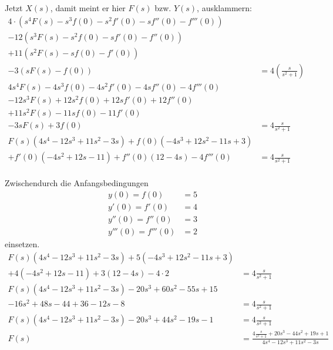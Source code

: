 \documentclass[%
	paper=a4,%
	pagesize=auto	%
	]{scrartcl}
\begin{document}
	Jetzt \(X(s)\), damit meint er hier \(F(s)\) bzw. \(Y(s)\), ausklammern:
\begin{align*}
	4 \cdot \left(s^4 F(s) -s^3 f(0) - s^2 f'(0) - sf''(0) - f'''(0)\right)\\
		- 12 \left(s^3 F(s) - s^2 f(0) - sf'(0) - f''(0)\right)\\
		+ 11 \left(s^2 F(s) - sf(0) - f'(0)\right)\\
		- 3 \left(s F(s) - f(0)\right)
		& = 4 \left(\frac{s}{s^2 + 1}\right)\\
	4 s^4 F(s) - 4 s^3 f(0) - 4 s^2 f'(0) - 4 sf''(0) - 4 f'''(0)\\
		- 12 s^3 F(s) + 12 s^2 f(0) + 12 sf'(0) + 12 f''(0)\\
		+ 11 s^2 F(s) - 11 s f(0) - 11 f'(0)\\
		- 3 s F(s) + 3 f(0)
		& = 4 \frac{s}{s^2 + 1}\\
	F(s) \left(4 s^4 - 12 s^3 + 11 s^2 - 3 s\right)
		+ f(0) \left(- 4 s^3 + 12 s^2 - 11 s + 3\right)\\
		+ f'(0) \left(- 4 s^2 + 12 s - 11\right)
		+ f''(0) \left(12 - 4s\right)
		- 4 f'''(0)
		& = 4 \frac{s}{s^2 + 1}\\
\end{align*}

Zwischendurch die Anfangsbedingungen
\begin{align*}
	y(0) = f(0) &= 5\\
	y'(0) = f'(0) &= 4\\
	y''(0) = f''(0) &= 3\\
	y'''(0) = f'''(0) &= 2
\end{align*}
einsetzen.
\begin{align*}
	F(s) \left(4 s^4 - 12 s^3 + 11 s^2 - 3 s\right)
		+ 5 \left(- 4 s^3 + 12 s^2 - 11 s + 3\right)\\
		+ 4 \left(- 4 s^2 + 12 s - 11\right)
		+ 3 \left(12 - 4s\right)
		- 4 \cdot 2
		& = 4 \frac{s}{s^2 + 1}\\
	F(s) \left(4 s^4 - 12 s^3 + 11 s^2 - 3 s\right)
		- 20 s^3 + 60 s^2 - 55 s + 15\\
		- 16 s^2 + 48 s - 44
		+ 36 - 12s
		- 8
		& = 4 \frac{s}{s^2 + 1}\\
	F(s) \left(4 s^4 - 12 s^3 + 11 s^2 - 3 s\right)
		- 20 s^3
		+ 44 s^2
		- 19 s
		- 1
		& = 4 \frac{s}{s^2 + 1}\\
	F(s)
		& = \frac{4 \frac{s}{s^2 + 1}
		+ 20 s^3
		- 44 s^2
		+ 19 s
		+ 1
		}{
			4 s^4 - 12 s^3 + 11 s^2 - 3 s
		}
		\\
\end{align*}
\end{document}

